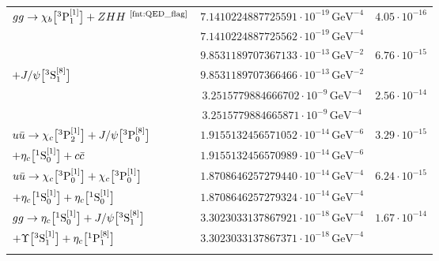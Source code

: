 \begin{table}[H]
\begin{tabular}[t]{lcc}
\multirow{2}{*}{$g g \to \chi_b\big[{}^3\pwave_{1}^{[1]}\big] + Z H H \ \textsuperscript{\ref{fnt:QED_flag}}$} & $7.1410224887725591 \cdot 10^{-19}\,\mathrm{GeV}^{-4}$ & \multirow{2}{*}{$4.05 \cdot 10^{-16}$} \\
& $7.1410224887725562 \cdot 10^{-19}\,\mathrm{GeV}^{-4}$ & \\ 
\hdashline

\multirow{1}{*}{$ g g \to \chi_c\big[{}^3\pwave_{0}^{[1]}\big] + \chi_c\big[{}^3\pwave_{1}^{[1]}\big]$} & $9.8531189707367133 \cdot 10^{-13}\,\mathrm{GeV}^{-2}$ & \multirow{2}{*}{$6.76 \cdot 10^{-15}$} \\
\qquad\qquad$+ J/\psi\big[{}^3\mathrm{S}_{1}^{[8]}\big]$ & $9.8531189707366466 \cdot 10^{-13}\,\mathrm{GeV}^{-2}$ & \\ 
\hdashline

\multirow{2}{*}{$g g \to J/\psi\big[{}^3\pwave_{2}^{[8]}\big] + \eta_c\big[{}^1\pwave_{1}^{[8]}\big] + c \bar{c}$} & $3.2515779884666702 \cdot 10^{-9}\,\mathrm{GeV}^{-4}$ & \multirow{2}{*}{$2.56 \cdot 10^{-14}$} \\
& $3.2515779884665871 \cdot 10^{-9}\,\mathrm{GeV}^{-4}$ & \\ 
\hdashline
 
{$u \bar{u} \to \chi_c\big[{}^3\mathrm{P}_{2}^{[1]}\big] + J/\psi\big[{}^3\mathrm{P}_{0}^{[8]}\big]$} & 
$1.9155132456571052 \cdot 10^{-14}\,\mathrm{GeV}^{-6}$ & \multirow{2}{*}{$3.29 \cdot 10^{-15}$} \\ 
{\qquad\qquad$ + \eta_c\big[{}^1\mathrm{S}_{0}^{[1]}\big] + c \bar{c}$}& $1.9155132456570989 \cdot 10^{-14}\,\mathrm{GeV}^{-6}$ & \\ 
\hdashline

{$u \bar{u} \to \chi_c\big[{}^3\mathrm{P}_{0}^{[1]}\big] + \chi_c\big[{}^3\mathrm{P}_{0}^{[1]}\big]$} & 
$1.8708646257279440 \cdot 10^{-14}\,\mathrm{GeV}^{-4}$ & \multirow{2}{*}{$6.24 \cdot 10^{-15}$} \\ 
{\qquad\qquad$+ \eta_c\big[{}^1\mathrm{S}_{0}^{[1]}\big] + \eta_c\big[{}^1\mathrm{S}_{0}^{[1]}\big]$} & 
$1.8708646257279324 \cdot 10^{-14}\,\mathrm{GeV}^{-4}$ & \\ 
\hdashline 

{$g g \to \eta_c\big[{}^1\mathrm{S}_{0}^{[1]}\big] + J/\psi\big[{}^3\mathrm{S}_{1}^{[8]}\big] $} & 
$3.3023033137867921 \cdot 10^{-18}\,\mathrm{GeV}^{-4}$ & \multirow{2}{*}{$1.67 \cdot 10^{-14}$} \\ 
{\qquad\qquad$+\Upsilon\big[{}^3\mathrm{S}_{1}^{[1]}\big] + \eta_c\big[{}^1\mathrm{P}_{1}^{[8]}\big]$} & 
$3.3023033137867371 \cdot 10^{-18}\,\mathrm{GeV}^{-4}$ & \\
\hdashline


\end{tabular}
\end{table}
